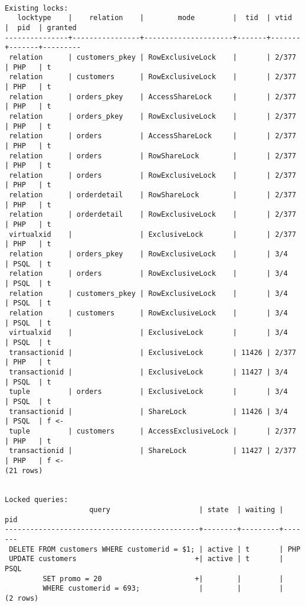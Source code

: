 \documentclass{article}
\begin{document}
\begin{Verbatim}[frame=lines]

Existing locks:
   locktype    |    relation    |        mode         |  tid  | vtid  |  pid  | granted
---------------+----------------+---------------------+-------+-------+-------+---------
 relation      | customers_pkey | RowExclusiveLock    |       | 2/377 | PHP   | t
 relation      | customers      | RowExclusiveLock    |       | 2/377 | PHP   | t
 relation      | orders_pkey    | AccessShareLock     |       | 2/377 | PHP   | t
 relation      | orders_pkey    | RowExclusiveLock    |       | 2/377 | PHP   | t
 relation      | orders         | AccessShareLock     |       | 2/377 | PHP   | t
 relation      | orders         | RowShareLock        |       | 2/377 | PHP   | t
 relation      | orders         | RowExclusiveLock    |       | 2/377 | PHP   | t
 relation      | orderdetail    | RowShareLock        |       | 2/377 | PHP   | t
 relation      | orderdetail    | RowExclusiveLock    |       | 2/377 | PHP   | t
 virtualxid    |                | ExclusiveLock       |       | 2/377 | PHP   | t
 relation      | orders_pkey    | RowExclusiveLock    |       | 3/4   | PSQL  | t
 relation      | orders         | RowExclusiveLock    |       | 3/4   | PSQL  | t
 relation      | customers_pkey | RowExclusiveLock    |       | 3/4   | PSQL  | t
 relation      | customers      | RowExclusiveLock    |       | 3/4   | PSQL  | t
 virtualxid    |                | ExclusiveLock       |       | 3/4   | PSQL  | t
 transactionid |                | ExclusiveLock       | 11426 | 2/377 | PHP   | t
 transactionid |                | ExclusiveLock       | 11427 | 3/4   | PSQL  | t
 tuple         | orders         | ExclusiveLock       |       | 3/4   | PSQL  | t
 transactionid |                | ShareLock           | 11426 | 3/4   | PSQL  | f <-
 tuple         | customers      | AccessExclusiveLock |       | 2/377 | PHP   | t
 transactionid |                | ShareLock           | 11427 | 2/377 | PHP   | f <-
(21 rows)


Locked queries:
                    query                     | state  | waiting |  pid
----------------------------------------------+--------+---------+-------
 DELETE FROM customers WHERE customerid = $1; | active | t       | PHP
 UPDATE customers                            +| active | t       | PSQL
         SET promo = 20                      +|        |         |
         WHERE customerid = 693;              |        |         |
(2 rows)
\end{Verbatim}
\end{document}
